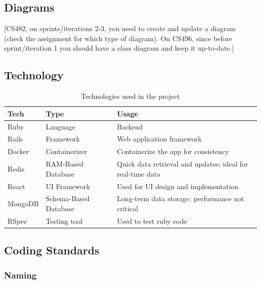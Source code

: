 \documentclass{article}
\begin{document}
\subsection{Diagrams}
[CS482, on sprints/iterations 2-3, you need to create and update a diagram (check the assignment for which type of diagram). On CS496, since before sprint/iteration 1 you should have a class diagram and keep it up-to-date.]

\subsection{Technology}
\begin{table}[h!]
\centering
\begin{tabular}{|l|l|p{8cm}|}
\hline
\textbf{Tech} & \textbf{Type} & \textbf{Usage} \\ \hline
Ruby & Language & Backend \\ \hline
Rails & Framework & Web application framework \\ \hline
Docker & Containerizer & Containerize the app for consistency \\ \hline
Redis & RAM-Based Database & Quick data retrieval and updates; ideal for real-time data \\ \hline
React & UI Framework & Used for UI design and implementation \\ \hline
MongoDB & Schema-Based Database & Long-term data storage; performance not critical \\ \hline
RSpec & Testing tool & Used to test ruby code\\ \hline
\end{tabular}
\caption{Technologies used in the project}
\label{tab:technologies}
\end{table}

\subsection{Coding Standards}
\subsubsection{Naming}
\end{document}
